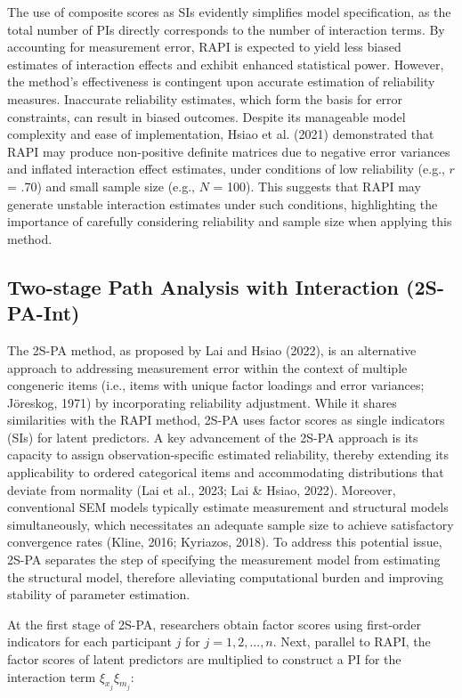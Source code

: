 \documentclass[
  man,mask]{apa6}
\begin{document}
The use of composite scores as SIs evidently simplifies model specification, as the total number of PIs directly corresponds to the number of interaction terms. By accounting for measurement error, RAPI is expected to yield less biased estimates of interaction effects and exhibit enhanced statistical power. However, the method's effectiveness is contingent upon accurate estimation of reliability measures. Inaccurate reliability estimates, which form the basis for error constraints, can result in biased outcomes. Despite its manageable model complexity and ease of implementation, Hsiao et al. (2021) demonstrated that RAPI may produce non-positive definite matrices due to negative error variances and inflated interaction effect estimates, under conditions of low reliability (e.g., \(\textit{r}\) = .70) and small sample size (e.g., \(\textit{N}\) = 100). This suggests that RAPI may generate unstable interaction estimates under such conditions, highlighting the importance of carefully considering reliability and sample size when applying this method.

\subsection{Two-stage Path Analysis with Interaction (2S-PA-Int)}\label{two-stage-path-analysis-with-interaction-2s-pa-int}

The 2S-PA method, as proposed by Lai and Hsiao (2022), is an alternative approach to addressing measurement error within the context of multiple congeneric items (i.e., items with unique factor loadings and error variances; Jöreskog, 1971) by incorporating reliability adjustment. While it shares similarities with the RAPI method, 2S-PA uses factor scores as single indicators (SIs) for latent predictors. A key advancement of the 2S-PA approach is its capacity to assign observation-specific estimated reliability, thereby extending its applicability to ordered categorical items and accommodating distributions that deviate from normality (Lai et al., 2023; Lai \& Hsiao, 2022). Moreover, conventional SEM models typically estimate measurement and structural models simultaneously, which necessitates an adequate sample size to achieve satisfactory convergence rates (Kline, 2016; Kyriazos, 2018). To address this potential issue, 2S-PA separates the step of specifying the measurement model from estimating the structural model, therefore alleviating computational burden and improving stability of parameter estimation.

At the first stage of 2S-PA, researchers obtain factor scores using first-order indicators for each participant \(j\) for \(j = 1, 2, ..., n\). Next, parallel to RAPI, the factor scores of latent predictors are multiplied to construct a PI for the interaction term \(\xi_{x_{j}}\xi_{m_{j}}\):
\end{document}
